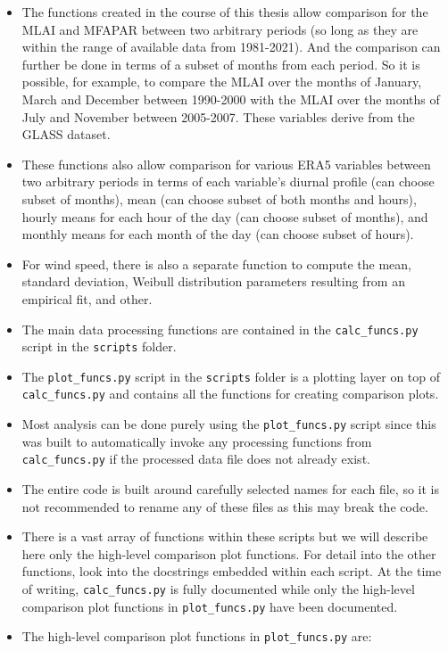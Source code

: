 \begin{itemize}
	\item The functions created in the course of this thesis allow comparison for the \acf{MLAI} and \acf{MFAPAR} between two arbitrary periods (so long as they are within the range of available data from 1981-2021). And the comparison can further be done in terms of a subset of months from each period. So it is possible, for example, to compare the \ac{MLAI} over the months of January, March and December between 1990-2000 with the \ac{MLAI} over the months of July and November between 2005-2007. These variables derive from the \ac{GLASS} dataset.
	\item These functions also allow comparison for various \ac{ERA5} variables between two arbitrary periods in terms of each variable's diurnal profile (can choose subset of months), mean (can choose subset of both months and hours), hourly means for each hour of the day (can choose subset of months), and monthly means for each month of the day (can choose subset of hours).
	\item For wind speed, there is also a separate function to compute the mean, standard deviation, Weibull distribution parameters resulting from an empirical fit, and other.
	\item The main data processing functions are contained in the \verb+calc_funcs.py+ script in the \verb+scripts+ folder.
	\item The \verb+plot_funcs.py+ script in the \verb+scripts+ folder is a plotting layer on top of \verb+calc_funcs.py+ and contains all the functions for creating comparison plots.
	\item Most analysis can be done purely using the \verb+plot_funcs.py+ script since this was built to automatically invoke any processing functions from \verb+calc_funcs.py+ if the processed data file does not already exist.
	\item The entire code is built around carefully selected names for each file, so it is not recommended to rename any of these files as this may break the code.
	\item There is a vast array of functions within these scripts but we will describe here only the high-level comparison plot functions. For detail into the other functions, look into the docstrings embedded within each script. At the time of writing, \verb+calc_funcs.py+ is fully documented while only the high-level comparison plot functions in \verb+plot_funcs.py+ have been documented.
	\item The high-level comparison plot functions in \verb+plot_funcs.py+ are: 

\end{itemize}
